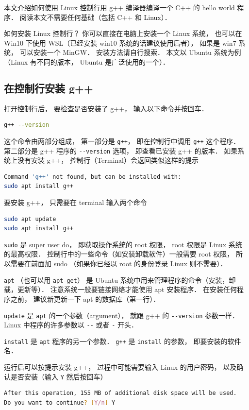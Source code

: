 
本文介绍如何使用 Linux 控制行用 g++ 编译器编译一个 C++ 的 hello world 程序． 阅读本文不需要任何基础（包括 C++ 和 Linux）．

如何安装 Linux 控制行？ 你可以直接在电脑上安装一个 Linux 系统， 也可以在 Win10 下使用 WSL（已经安装 win10 系统的话建议使用后者）， 如果是 win7 系统， 可以安装一个 MinGW． 安装方法请自行搜索． 本文以 Ubuntu 系统为例（Linux 有不同的版本， Ubuntu 是广泛使用的一个）．

\subsection{在控制行安装 g++}
打开控制行后， 要检查是否安装了 g++， 输入以下命令并按回车．
\begin{lstlisting}[language=bash]
g++ --version
\end{lstlisting}
这个命令由两部分组成， 第一部分是 \lstinline|g++|， 即在控制行中调用 \lstinline|g++| 这个程序． 第二部分是 g++ 程序的 \lstinline|--version| 选项， 即查看已安装 g++ 的版本． 如果系统上没有安装 g++， 控制行（Terminal）会返回类似这样的提示
\begin{lstlisting}[language=bash]
Command 'g++' not found, but can be installed with:
sudo apt install g++
\end{lstlisting}
要安装 g++， 只需要在 terminal 输入两个命令
\begin{lstlisting}[language=bash]
sudo apt update
sudo apt install g++
\end{lstlisting}
\lstinline|sudo| 是 super user do， 即获取操作系统的 root 权限， root 权限是 Linux 系统的最高权限． 控制行中的一些命令（如安装卸载软件）一般需要 root 权限， 所以需要在前面加 sudo （如果你已经以 root 的身份登录 Linux 则不需要）．

\lstinline|apt| （也可以用 \lstinline|apt-get|） 是 Ubuntu 系统中用来管理程序的命令（安装，卸载，更新等）． 注意系统一般要链接网络才能使用 apt 安装程序． 在安装任何程序之前， 建议新更新一下 apt 的数据库（第一行）．

\lstinline|update| 是 \lstinline|apt| 的一个参数（argument）， 就跟 g++ 的 \lstinline|--version| 参数一样． Linux 中程序的许多参数以 \lstinline|--| 或者 \lstinline|-| 开头．

\lstinline|install| 是 \lstinline|apt| 程序的另一个参数． \lstinline|g++| 是 \lstinline|install| 的参数， 即要安装的软件名．

运行后可以按提示安装 g++， 过程中可能需要输入 Linux 的用户密码， 以及确认是否安装（输入 \lstinline|Y| 然后按回车）
\begin{lstlisting}[language=bash]
After this operation, 155 MB of additional disk space will be used.
Do you want to continue? [Y/n] Y
\end{lstlisting}

